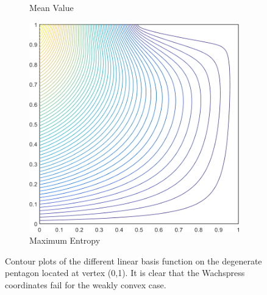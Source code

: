 \begin{figure}
{\begin{subfigure}[b]{0.39\textwidth}
		\caption{Mean Value}
	\end{subfigure}
	\hspace{1.5cm}
	\begin{subfigure}[b]{0.39\textwidth}
		\centering
		\includegraphics[width=\textwidth]{figures/sec_BF/deg_square_MAXENT1_contour_b5.png}
		\caption{Maximum Entropy}
	\end{subfigure}
}
\caption{Contour plots of the different linear basis function on the degenerate pentagon located at vertex (0,1). It is clear that the Wachspress coordinates fail for the weakly convex case.}
\label{fig::2D_Summary_deg_square_basis_functions}
\end{figure}

